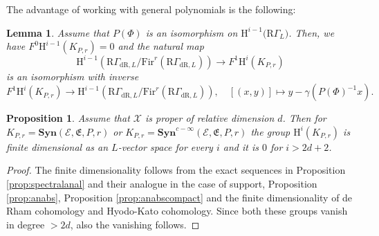 \documentclass[asterisque,english]{smfart}
\newtheorem{lemma}[theo]{Lemma}
\newtheorem{proposition}[theo]{Proposition}
\begin{document}
The advantage of working with  general polynomials is the following:

\begin{lemma}\label{lemma:Poly R1} Assume that $P(\Phi) $ is an isomorphism on $\mathrm{H}^{i-1}\bigl(\mathrm{R}\Gamma _{L}\bigr)$. Then, we have $F^0\mathrm{H}^{i-1}(K_{P,r}) =0$ and the natural map  $$\mathrm{H}^{i-1}\left(\mathrm{R}\Gamma _{\mathrm{dR},L}/\mathrm{Fir}^{r}\left(
\mathrm{R}\Gamma _{\mathrm{dR},L}\right)\right)\longrightarrow  F^1 \mathrm{H}^i(K_{P,r})$$is an isomorphism with inverse 
$$F^1 \mathrm{H}^i(K_{P,r})\longrightarrow \mathrm{H}^{i-1}\left(\mathrm{R}\Gamma _{\mathrm{dR},L}/\mathrm{Fir}^{r}\left(
\mathrm{R}\Gamma _{\mathrm{dR},L}\right)\right), \quad [(x,y)] \mapsto y-\gamma \left( P\left(\Phi\right)^{-1}x\right).$$
\end{lemma}



\begin{proposition}\label{prop:Poly P finiteness} Assume that $\mathcal{X}$ is proper of relative dimension $d$. Then for $K_{P,r}=\mathbf{Syn}(\mathcal{E},\mathfrak{E},P, r)$ or $K_{P,r}=\mathbf{Syn}^{c-\infty}(\mathcal{E},\mathfrak{E},P,r)$ the group $\mathrm{ H}^{i}\left( K_{P,r}\right) $ is finite dimensional as an $L$-vector space  for every   $i$ and it is $0$ for $i>2d+2$.
\end{proposition}

\begin{proof}
The finite dimensionality follows from  the exact sequences in Proposition \ref{prop:spectralanal} and their analogue in the case of support, Proposition \ref{prop:anabs}, Proposition \ref{prop:anabscompact} and the finite dimensionality of de Rham cohomology and Hyodo-Kato cohomology. Since both these groups vanish in degree $> 2d$, also the vanishing follows. 
\end{proof}

\end{document}
